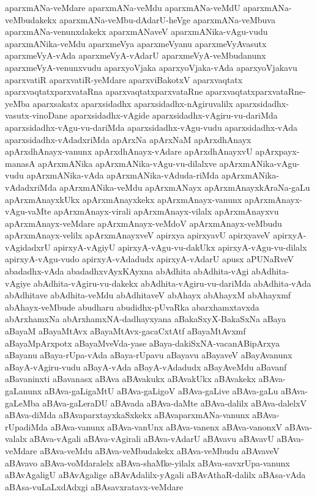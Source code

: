 {aparxmANa-veMdare
aparxmANa-veMdu
aparxmANa-veMdU
aparxmANa-veMbudakekx
aparxmANa-veMbu-dAdarU-heVge
aparxmANa-veMbuva
aparxmANa-venunxdakekx
aparxmANaveV
aparxmANika-vAgu-vudu
aparxmANika-veMdu
aparxmeVya
aparxmeVyanu
aparxmeVyAvasutx
aparxmeVyA-vAda
aparxmeVyA-vAdarU
aparxmeVyA-veMbudanunx
aparxmeVyA-venunxvudu
aparxyoVjaka
aparxyoVjaka-vAda
aparxyoVjakavu
aparxvatiR
aparxvatiR-yeMdare
aparxviBakotxV
aparxvaqtatx
aparxvaqtatxparxvataRna
aparxvaqtatxparxvataRne
aparxvaqtatxparxvataRne-yeMba
aparxsakatx
aparxsidadhx
aparxsidadhx-nAgiruvalilx
aparxsidadhx-vasutx-vinoDane
aparxsidadhx-vAgide
aparxsidadhx-vAgiru-vu-dariMda
aparxsidadhx-vAgu-vu-dariMda
aparxsidadhx-vAgu-vudu
aparxsidadhx-vAda
aparxsidadhx-vAdadxriMda
apArxNa
apArxNaM
apArxdhAnayx
apArxdhAnayx-vanunx
apArxdhAnayx-vAdare
apArxdhAnayxvU
apArxpayx-manasA
apArxmANika
apArxmANika-vAgu-vu-dilalxve
apArxmANika-vAgu-vudu
apArxmANika-vAda
apArxmANika-vAduda-riMda
apArxmANika-vAdadxriMda
apArxmANika-veMdu
apArxmANayx
apArxmAnayxkAraNa-gaLu
apArxmAnayxkUkx
apArxmAnayxkekx
apArxmAnayx-vanunx
apArxmAnayx-vAgu-vaMte
apArxmAnayx-virali
apArxmAnayx-vilalx
apArxmAnayxvu
apArxmAnayx-veMdare
apArxmAnayx-veMdoV
apArxmAnayx-veMbudu
apArxmAnayx-velilx
apArxmAnayxveV
apirxya
apirxyavU
apirxyaveV
apirxyA-vAgidadxrU
apirxyA-vAgiyU
apirxyA-vAgu-vu-dakUkx
apirxyA-vAgu-vu-dilalx
apirxyA-vAgu-vudo
apirxyA-vAdadudx
apirxyA-vAdarU
apusx
aPUNaRveV
abadadhx-vAda
abadadhxvAyxKAyxna
abAdhita
abAdhita-vAgi
abAdhita-vAgiye
abAdhita-vAgiru-vu-dakekx
abAdhita-vAgiru-vu-dariMda
abAdhita-vAda
abAdhitave
abAdhita-veMdu
abAdhitaveV
abAhayx
abAhayxM
abAhayxmf
abAhayx-veMbude
abudharu
abudidhx-pUvaRka
abarxhamxtavxda
abArxhamxNa
abArxhamxNA-dadhayxyana
aBakaSxyX-BakaSxNa
aBaya
aBayaM
aBayaMtAvx
aBayaMtAvx-gacaCxtAtf
aBayaMtAvxmf
aBayaMpArxpotx
aBayaMveVda-yase
aBaya-dakiSxNA-vacanABipArxya
aBayanu
aBaya-rUpa-vAda
aBaya-rUpavu
aBayavu
aBayaveV
aBayAvanunx
aBayA-vAgiru-vudu
aBayA-vAda
aBayA-vAdadudx
aBayAveMdu
aBavanf
aBavaninxti
aBavanasx
aBAva
aBAvakukx
aBAvakUkx
aBAvakekx
aBAva-gaLanunx
aBAva-gaLigaMtU
aBAva-gaLigoV
aBAva-gaLive
aBAva-gaLu
aBAva-gaLeMba
aBAva-gaLeraDU
aBAvada
aBAva-daMte
aBAva-dalilx
aBAva-dalelxV
aBAva-diMda
aBAvaparxtayxkaSxkekx
aBAvaparxmANa-vanunx
aBAva-rUpadiMda
aBAva-vanunx
aBAva-vanUnx
aBAva-vanenx
aBAva-vanonxV
aBAva-valalx
aBAva-vAgali
aBAva-vAgirali
aBAva-vAdarU
aBAvavu
aBAvavU
aBAva-veMdare
aBAva-veMdu
aBAva-veMbudakekx
aBAva-veMbudu
aBAvaveV
aBAvavo
aBAva-voMdaralelx
aBAva-shaMke-yilalx
aBAva-savxrUpa-vanunx
aBAvAgaligU
aBAvAgalige
aBAvAdalilx-yAgali
aBAvAthaR-dalilx
aBAsa-vAda
aBAsa-vuLaLxdAdxgi
aBAsavxratavx-veMdare
}
